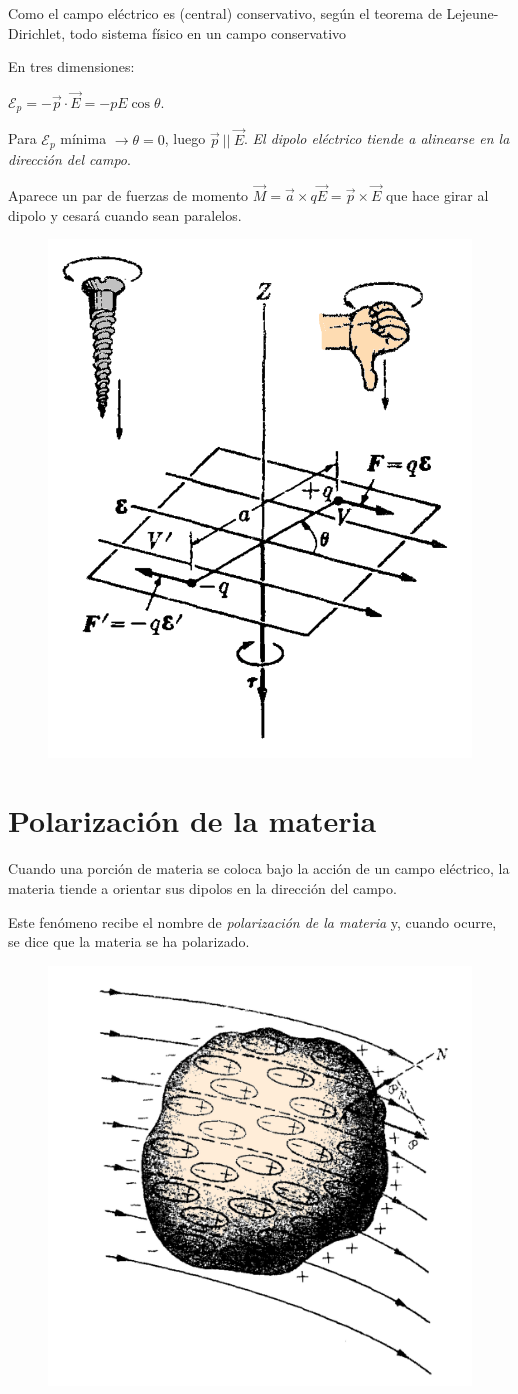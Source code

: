\begin{multicols}{2}
Como el campo eléctrico es (central) conservativo, según el teorema de Lejeune-Dirichlet, todo sistema físico en un campo conservativo 

En tres dimensiones: 

$\mathcal E_p=-\vec p \cdot \vec E=-pE\cos \theta$. 

Para $\mathcal E_p$ mínima $\to \theta=0$, luego $\vec p \ || \ \vec E$. \emph{El dipolo eléctrico tiende a alinearse en la dirección del campo}.

Aparece un par de fuerzas de momento $\vec M=\vec a \times q\vec E=\vec p \times \vec E$ que hace girar al dipolo y cesará cuando sean paralelos.

\begin{figure}[H]
	\centering
	\includegraphics[width=.4\textwidth]{imagenes/imagenes24/T24IM06.png}
\end{figure}
\end{multicols}

\section{Polarización de la materia}


\begin{multicols}{2}
Cuando una porción de materia se coloca bajo la acción de un campo eléctrico, la materia tiende a orientar sus dipolos en la dirección del campo. 

Este fenómeno recibe el nombre de \emph{polarización de la materia} y, cuando ocurre, se dice que la materia se ha polarizado.
\begin{figure}[H]
	\centering
	\includegraphics[width=.35\textwidth]{imagenes/imagenes24/T24IM07.png}
\end{figure}
\end{multicols}

